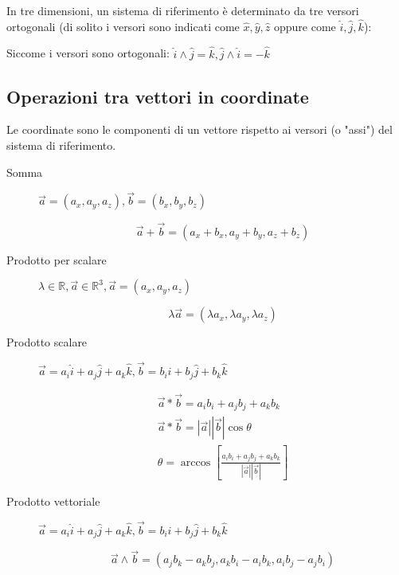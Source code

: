 \documentclass{article}
\begin{document}
\noindent
In tre dimensioni, un sistema di riferimento è determinato da tre versori ortogonali (di solito i versori sono indicati come $\hat{x}, \hat{y}, \hat{z}$ oppure come $\hat{i}, \hat{j}, \hat{k}$):

\begin{center}
\end{center}

\noindent
Siccome i versori sono ortogonali: $\hat{i} \wedge \hat{j} = \hat{k}, \hat{j} \wedge \hat{i} = -\hat{k}$

\subsection{Operazioni tra vettori in coordinate}

Le coordinate sono le componenti di un vettore rispetto ai versori (o "assi") del sistema di riferimento.

\begin{description}
\item[Somma] $\vec{a} = (a_x, a_y, a_z), \vec{b} = (b_x, b_y, b_z)$

$$
\vec{a} + \vec{b} = (a_x+b_x, a_y+b_y, a_z+b_z)
$$

\item[Prodotto per scalare] $\lambda \in \mathbb{R}, \vec{a} \in \mathbb{R}^3, \vec{a} = (a_x, a_y, a_z)$

$$
\lambda \vec{a} = (\lambda a_x, \lambda a_y, \lambda a_z)
$$

\item[Prodotto scalare] $\vec{a} = a_i \hat{i} + a_j \hat{j} + a_k \hat{k}, \vec{b} = b_i \hat{i} + b_j \hat{j} + b_k \hat{k}$

$$
\begin{matrix}
\vec{a} * \vec{b} = a_ib_i + a_jb_j + a_kb_k \\
\vec{a} * \vec{b} = |\vec{a}| |\vec{b}| \cos{\theta} \\
\theta = \arccos{[\frac{a_ib_i + a_jb_j + a_kb_k}{|\vec{a}||\vec{b}|}]}
\end{matrix}
$$

\item[Prodotto vettoriale] $\vec{a} = a_i \hat{i} + a_j \hat{j} + a_k \hat{k}, \vec{b} = b_i \hat{i} + b_j \hat{j} + b_k \hat{k}$

$$
\vec{a} \wedge \vec{b} = (a_jb_k - a_kb_j, a_kb_i - a_ib_k, a_ib_j - a_jb_i)
$$
\end{description}
\end{document}
